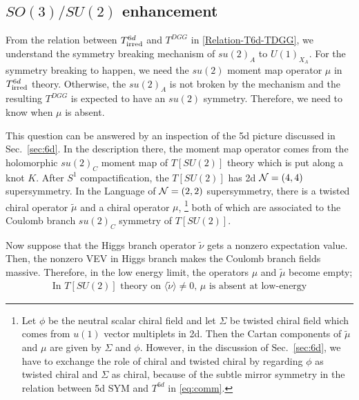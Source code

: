 \documentclass[a4paper,11pt]{article}
\def\CN{{\cal N}}
\begin{document}
\subsection{$SO(3)/SU(2)$ enhancement}\label{sec:en}
From the relation between $T_{\rm irred}^{6d}$ and $T^{DGG}$ in  \eqref{Relation-T6d-TDGG}, we understand the symmetry breaking mechanism of $su(2)_A$  to $ U(1)_{X_A}$. For the symmetry breaking to happen, we need the $su(2)$ moment map operator $\mu$ in $T^{6d}_{\rm irred}$ theory. Otherwise, the $su(2)_A$ is not broken by the mechanism and the resulting $T^{DGG}$ is expected to have an $su(2)$ symmetry. 
Therefore, we need to know when $\mu$ is absent.

This question can be answered by an inspection of the 5d picture discussed in Sec.~\ref{sec:6d}.
In the description there,
the moment map operator comes from the holomorphic $su(2)_C$ moment map of $T[SU(2)]$ theory which is put along a knot $K$. 
After $S^1$ compactification, the $T[SU(2)]$ has 2d $\CN=(4,4)$ supersymmetry. 
In the Language of $\CN=(2,2)$ supersymmetry, there is a twisted chiral operator $\widetilde{\mu}$ and a chiral operator $\mu$,
\footnote{
Let $\phi$ be the neutral scalar chiral field and let $\Sigma$ be twisted chiral field which comes from $u(1)$ vector multiplets in 2d.
Then the Cartan components of $\widetilde{\mu}$ and $\mu$ are given by $\Sigma$ and $\phi$.
However, in the discussion of Sec.~\ref{sec:6d}, we have to exchange the role of chiral and twisted chiral by regarding $\phi$ as twisted chiral and 
$\Sigma$ as chiral, because of the subtle mirror symmetry in the relation between 5d SYM and $T^{6d}$ in \eqref{eq:comm}. 
}
both of which are associated to the Coulomb branch $su(2)_C$ symmetry of $T[SU(2)]$.

Now suppose that the Higgs branch operator $\widetilde{\nu}$ gets a nonzero expectation value.
Then, the nonzero VEV in Higgs branch makes the Coulomb branch fields massive. Therefore, in the low energy limit,
the operators $\mu$ and $\widetilde{\mu}$ become empty;
%
\begin{align}
\textrm{In $T[SU(2)]$ theory on $\langle \tilde{\nu} \rangle \neq 0$, $\mu$ is absent at low-energy}
\end{align}
%
\end{document}
